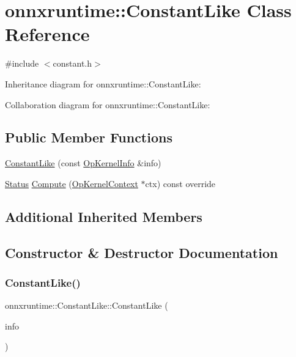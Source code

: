 \hypertarget{classonnxruntime_1_1ConstantLike}{}\section{onnxruntime\+:\+:Constant\+Like Class Reference}
\label{classonnxruntime_1_1ConstantLike}


{\ttfamily \#include $<$constant.\+h$>$}



Inheritance diagram for onnxruntime\+:\+:Constant\+Like\+:


Collaboration diagram for onnxruntime\+:\+:Constant\+Like\+:
\subsection*{Public Member Functions}
\begin{DoxyCompactItemize}
\item 
\mbox{\hyperlink{classonnxruntime_1_1ConstantLike_a550458476b4f788d5e78a13ee17c9002}{Constant\+Like}} (const \mbox{\hyperlink{classonnxruntime_1_1OpKernelInfo}{Op\+Kernel\+Info}} \&info)
\item 
\mbox{\hyperlink{classonnxruntime_1_1common_1_1Status}{Status}} \mbox{\hyperlink{classonnxruntime_1_1ConstantLike_ac6d5310ffc7f9603f4c988bb4ff6dfd2}{Compute}} (\mbox{\hyperlink{classonnxruntime_1_1OpKernelContext}{Op\+Kernel\+Context}} $\ast$ctx) const override
\end{DoxyCompactItemize}
\subsection*{Additional Inherited Members}


\subsection{Constructor \& Destructor Documentation}
\mbox{\label{classonnxruntime_1_1ConstantLike_a550458476b4f788d5e78a13ee17c9002}} 
\subsubsection{\texorpdfstring{Constant\+Like()}{ConstantLike()}}
{\footnotesize\ttfamily onnxruntime\+::\+Constant\+Like\+::\+Constant\+Like (\begin{DoxyParamCaption}\item[{const \mbox{\hyperlink{classonnxruntime_1_1OpKernelInfo}{Op\+Kernel\+Info}} \&}]{info }\end{DoxyParamCaption})\hspace{0.3cm}{\ttfamily [inline]}}



